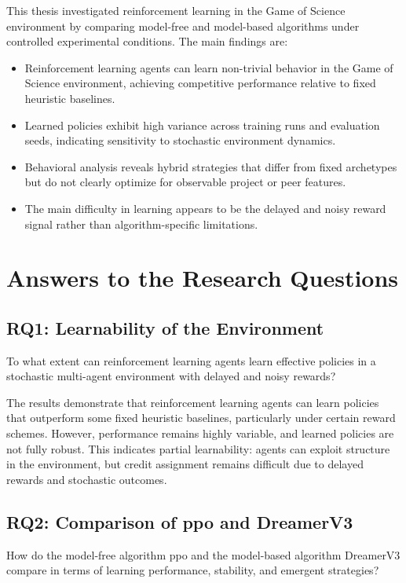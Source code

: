 \documentclass[english,bachelor]{hsluthesis}
\begin{document}
This thesis investigated reinforcement learning in the Game of Science environment by comparing model-free and model-based algorithms under controlled experimental conditions. The main findings are:

\begin{itemize}
    \item Reinforcement learning agents can learn non-trivial behavior in the Game of Science environment, achieving competitive performance relative to fixed heuristic baselines.
    \item Learned policies exhibit high variance across training runs and evaluation seeds, indicating sensitivity to stochastic environment dynamics.
    \item Behavioral analysis reveals hybrid strategies that differ from fixed archetypes but do not clearly optimize for observable project or peer features.
    \item The main difficulty in learning appears to be the delayed and noisy reward signal rather than algorithm-specific limitations.
\end{itemize}

\section{Answers to the Research Questions}

\subsection{RQ1: Learnability of the Environment}

To what extent can reinforcement learning agents learn effective policies in a stochastic multi-agent environment with delayed and noisy rewards?

The results demonstrate that reinforcement learning agents can learn policies that outperform some fixed heuristic baselines, particularly under certain reward schemes. However, performance remains highly variable, and learned policies are not fully robust. This indicates partial learnability: agents can exploit structure in the environment, but credit assignment remains difficult due to delayed rewards and stochastic outcomes.

\subsection{RQ2: Comparison of \gls{ppo} and DreamerV3}

How do the model-free algorithm \gls{ppo} and the model-based algorithm DreamerV3 compare in terms of learning performance, stability, and emergent strategies?
\end{document}
